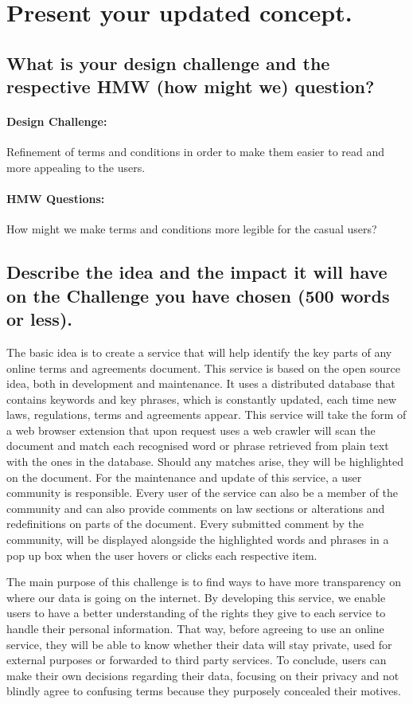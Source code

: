 \section{Present your updated concept.}
\label{s_9}

\subsection{What is your design challenge and the respective HMW (how might we) 
question?}
\paragraph{Design Challenge: } 
Refinement of terms and conditions in order to make them easier to read and more 
appealing to the users.
\paragraph{HMW Questions: }
How might we make terms and conditions more legible for the casual users?

\subsection{Describe the idea and the impact it will have on the Challenge you 
have chosen (500 words or less).}

The basic idea is to create a service that will help identify the key parts of 
any online terms and agreements document. This service is based on the open 
source idea, both in development and maintenance. It uses a distributed database 
that contains keywords and key phrases, which is constantly updated, each time 
new laws, regulations, terms and agreements appear. This service will take the 
form of a web browser extension that upon request uses a web crawler will scan 
the document and match each recognised word or phrase retrieved from plain text 
with the ones in the database. Should any matches arise, they will be 
highlighted on the document. For the maintenance and update of this service, a 
user community is responsible. Every user of the service can also be a member of 
the community and can also provide comments on law sections or alterations and 
redefinitions on parts of the document. Every submitted comment by the community, 
will be displayed alongside the highlighted words and phrases in a pop up box 
when the user hovers or clicks each respective item.

The main purpose of this challenge is to find ways to have more transparency on 
where our data is going on the internet. By developing this service, we enable 
users to have a better understanding of the rights they give to each service to 
handle their personal information. That way, before agreeing to use an online 
service, they will be able to know whether their data will stay private, used 
for external purposes or forwarded to third party services. To conclude, users 
can make their own decisions regarding their data, focusing on their privacy and 
not blindly agree to confusing terms because they purposely concealed their 
motives.

